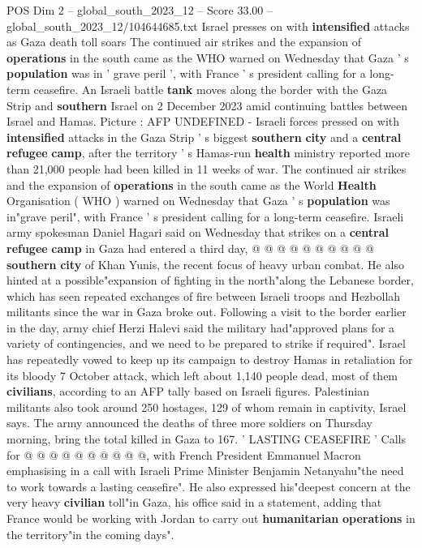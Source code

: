 \begin{textsample}{POS Dim 2 – global\_south\_2023\_12 – Score 33.00 – global\_south\_2023\_12/104644685.txt}  \label{ex:f2_pos_021}
Israel presses on with \textbf{intensified} attacks as Gaza death toll soars The continued air strikes and the expansion of \textbf{operations} in the south came as the WHO warned on Wednesday that Gaza ' s \textbf{population} was in ' grave peril ', with France ' s president calling for a long-term ceasefire.
An Israeli battle \textbf{tank} moves along the border with the Gaza Strip and \textbf{southern} Israel on 2 December 2023 amid continuing battles between Israel and Hamas.
Picture : AFP UNDEFINED - Israeli forces pressed on with \textbf{intensified} attacks in the Gaza Strip ' s biggest \textbf{southern} \textbf{city} and a \textbf{central} \textbf{refugee} \textbf{camp}, after the territory ' s Hamas-run \textbf{health} ministry reported more than 21,000 people had been killed in 11 weeks of war.
The continued air strikes and the expansion of \textbf{operations} in the south came as the World \textbf{Health} Organisation ( WHO ) warned on Wednesday that Gaza ' s \textbf{population} was in"grave peril", with France ' s president calling for a long-term ceasefire.
Israeli army spokesman Daniel Hagari said on Wednesday that strikes on a \textbf{central} \textbf{refugee} \textbf{camp} in Gaza had entered a third day, @ @ @ @ @ @ @ @ @ @ \textbf{southern} \textbf{city} of Khan Yunis, the recent focus of heavy urban combat.
He also hinted at a possible"expansion of fighting in the north"along the Lebanese border, which has seen repeated exchanges of fire between Israeli troops and Hezbollah militants since the war in Gaza broke out.
Following a visit to the border earlier in the day, army chief Herzi Halevi said the military had"approved plans for a variety of contingencies, and we need to be prepared to strike if required".
Israel has repeatedly vowed to keep up its campaign to destroy Hamas in retaliation for its bloody 7 October attack, which left about 1,140 people dead, most of them \textbf{civilians}, according to an AFP tally based on Israeli figures.
Palestinian militants also took around 250 hostages, 129 of whom remain in captivity, Israel says.
The army announced the deaths of three more soldiers on Thursday morning, bring the total killed in Gaza to 167. ' LASTING CEASEFIRE ' Calls for @ @ @ @ @ @ @ @ @ @, with French President Emmanuel Macron emphasising in a call with Israeli Prime Minister Benjamin Netanyahu"the need to work towards a lasting ceasefire".
He also expressed his"deepest concern at the very heavy \textbf{civilian} toll"in Gaza, his office said in a statement, adding that France would be working with Jordan to carry out \textbf{humanitarian} \textbf{operations} in the territory"in the coming days".

\end{textsample}
